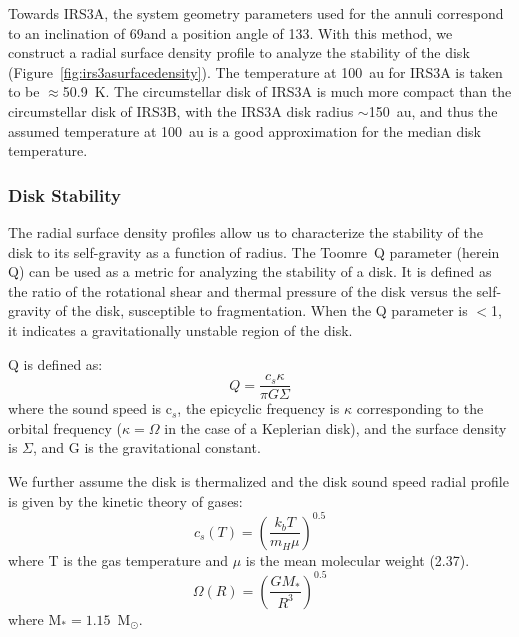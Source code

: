\documentclass[twocolumn, 12pt,trackchanges]{aastex63}
\renewcommand{\deg}{\degr}
\newcommand{\ab}{$\sim$}
\newcommand{\solm}{M$_{\odot}$}
\begin{document}
Towards IRS3A, the system geometry parameters used for the annuli correspond to an inclination of 69\deg\space and a position angle of 133\deg. With this method, we construct a radial surface density profile to analyze the stability of the disk (Figure~\ref{fig:irs3asurfacedensity}). The temperature at 100~au for IRS3A is taken to be $\approx$50.9~K. The circumstellar disk of IRS3A is much more compact than the circumstellar disk of IRS3B, with the IRS3A disk radius \ab150~au, and thus the assumed temperature at 100~au is a good approximation for the median disk temperature.


\subsubsection{Disk Stability}\label{sec:stability}
The radial surface density profiles allow us to characterize the stability of the disk to its self-gravity as a function of radius. The Toomre~Q parameter (herein Q) can be used as a metric for analyzing the stability of a disk. It is defined as the ratio of the rotational shear and thermal pressure of the disk versus the self-gravity of the disk, susceptible to fragmentation. When the Q parameter is $<$1, it indicates a gravitationally unstable region of the disk. 

Q is defined as: 
\begin{equation}
Q = \frac{c_{s} \kappa}{\pi G \Sigma}
\end{equation}
where the sound speed is c$_s$, the epicyclic frequency is $\kappa$ corresponding to the orbital frequency ($\kappa = \Omega$ in the case of a Keplerian disk), and the surface density is $\Sigma$, and G is the gravitational constant.

We further assume the disk is thermalized and the disk sound speed radial profile is given by the kinetic theory of gases: 
\begin{equation}\label{eq:cs}
c_{s}\left(T\right) = \left(\frac{k_{b}T}{m_{H} \mu}\right) ^{0.5}
\end{equation}
where T is the gas temperature and $\mu$ is the mean molecular weight (2.37).  
\begin{equation}
\Omega\left(R\right) = \left(\frac{GM_{*}}{R^{3}}\right)^{0.5}
\end{equation}
 where M$_{*}=1.15$~\solm.
 
\end{document}
